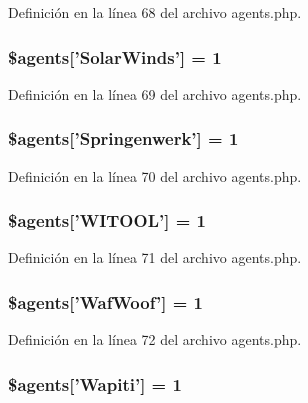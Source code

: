 Definición en la línea 68 del archivo agents.\-php.

\hypertarget{agents_8php_a80a655fb665ff06612df773049d886d6}{
\subsubsection[{\$agents}]{\setlength{\rightskip}{0pt plus 5cm}\$agents\mbox{[}'Solar\-Winds'\mbox{]} = 1}}\label{agents_8php_a80a655fb665ff06612df773049d886d6}


Definición en la línea 69 del archivo agents.\-php.

\hypertarget{agents_8php_aa6f3ca826e3bcd3042ad50f23db715fb}{
\subsubsection[{\$agents}]{\setlength{\rightskip}{0pt plus 5cm}\$agents\mbox{[}'Springenwerk'\mbox{]} = 1}}\label{agents_8php_aa6f3ca826e3bcd3042ad50f23db715fb}


Definición en la línea 70 del archivo agents.\-php.

\hypertarget{agents_8php_adf3d5815954d1610b0cdc03f9aea9d91}{
\subsubsection[{\$agents}]{\setlength{\rightskip}{0pt plus 5cm}\$agents\mbox{[}'W\-I\-T\-O\-O\-L'\mbox{]} = 1}}\label{agents_8php_adf3d5815954d1610b0cdc03f9aea9d91}


Definición en la línea 71 del archivo agents.\-php.

\hypertarget{agents_8php_aa257cf1f0f035c036d595e7d0f097b85}{
\subsubsection[{\$agents}]{\setlength{\rightskip}{0pt plus 5cm}\$agents\mbox{[}'Waf\-Woof'\mbox{]} = 1}}\label{agents_8php_aa257cf1f0f035c036d595e7d0f097b85}


Definición en la línea 72 del archivo agents.\-php.

\hypertarget{agents_8php_a008fbe5121b72210c7b2c2e8f77cb001}{
\subsubsection[{\$agents}]{\setlength{\rightskip}{0pt plus 5cm}\$agents\mbox{[}'Wapiti'\mbox{]} = 1}}\label{agents_8php_a008fbe5121b72210c7b2c2e8f77cb001}


